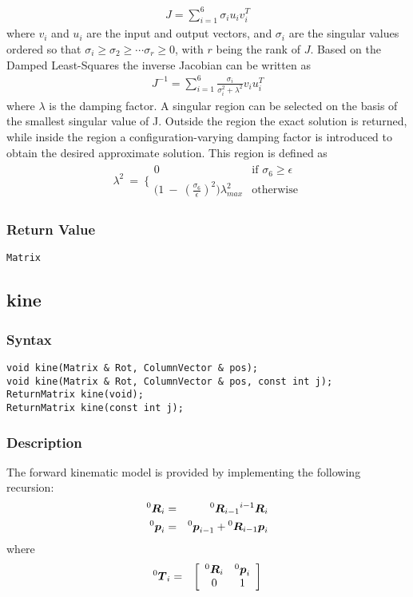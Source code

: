 \documentclass[dvips,11pt,fleqn]{report}
\newcommand{\mbold}[1]{\mbox{\boldmath $ #1 $}}
\newcommand{\matr}[2]{\left[\begin{array}{#1} #2 \end{array}\right]}
\begin{document}
\begin{eqnarray}
  J = \sum_{i=1}^6\sigma_i u_i v_i^T
\end{eqnarray}
where $v_i$ and $u_i$ are the input and output vectors, and $\sigma_i$ are the singular values ordered so that
$\sigma_i \geq \sigma_2 \geq \cdots \sigma_r \geq 0$, with $r$ being the rank of $J$. Based on the Damped Least-Squares
the inverse Jacobian can be written as
\begin{eqnarray}
  J^{-1} = \sum_{i=1}^6\frac{\sigma_i}{\sigma_i^2 + \lambda^2}v_iu_i^T
\end{eqnarray}
where $\lambda$ is the damping factor. A singular region can be selected on the basis of the smallest singular value of J.
Outside the region the exact solution is returned, while inside the region a configuration-varying damping factor is 
introduced to obtain the desired approximate solution. This region is defined as
\begin{eqnarray}
  \lambda^2\ =\ \Bigg\{
  \begin{array}{cc}
    0 &     \textrm{if $\sigma_6 \geq \epsilon$} \\
    \Big(1\ -\ (\frac{\sigma_6}{\epsilon})^2 \Big)\lambda^2_{max} & \textrm{otherwise}
  \end{array}
\end{eqnarray}

\subsubsection*{Return Value}

{\tt Matrix}
 \newpage 


\subsection*{kine}
\subsubsection*{Syntax}
\begin{verbatim}
void kine(Matrix & Rot, ColumnVector & pos);
void kine(Matrix & Rot, ColumnVector & pos, const int j);
ReturnMatrix kine(void);
ReturnMatrix kine(const int j);
\end{verbatim}
\subsubsection*{Description}
The forward kinematic model is provided by implementing 
the following recursion:
\begin{eqnarray}
{}^0 \mbold{R}_i & = & {}^0 \mbold{R}_{i-1} {}^{i-1}\mbold{R}_i \\
{}^0 \mbold{p}_i & = & {}^0 \mbold{p}_{i-1} + {}^0 \mbold{R}_{i-1} \mbold{p}_i 
\end{eqnarray}
where
\begin{eqnarray}
{}^0 \mbold{T}_i & = & \matr{cc}{
{}^0 \mbold{R}_{i} & {}^0 \mbold{p}_i \\
0 & 1 }
\end{eqnarray}
\end{document}
